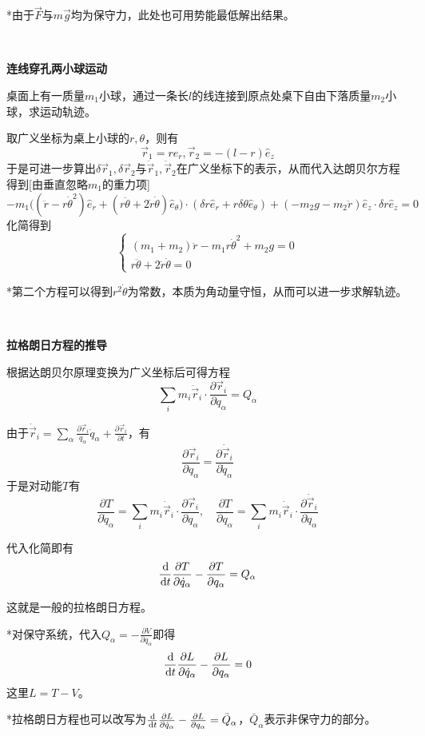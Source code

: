 \documentclass[a4paper,UTF8,fontset=windows]{ctexart}
\newcommand*{\dr}{\hspace{0.07em}\mathrm{d}}
\begin{document}
*由于$\vec{F}$与$m\vec{g}$均为保守力，此处也可用势能最低解出结果。

\

\textbf{连线穿孔两小球运动}

桌面上有一质量$m_1$小球，通过一条长$l$的线连接到原点处桌下自由下落质量$m_2$小球，求运动轨迹。

取广义坐标为桌上小球的$r,\theta$，则有
$$\vec{r}_1=r\hat{e}_r,\vec{r}_2=-(l-r)\hat{e}_z$$
于是可进一步算出$\delta\vec{r}_1,\delta\vec{r}_2$与$\ddot{\vec{r}}_1,\ddot{\vec{r}}_2$在广义坐标下的表示，从而代入达朗贝尔方程得到[由垂直忽略$m_1$的重力项]
$$-m_1\big((\ddot{r}-r\dot{\theta}^2)\hat{e}_r+(r\ddot{\theta}+2\dot{r}\dot{\theta})\hat{e}_\theta\big)\cdot(\delta r\hat{e}_r+r\delta\theta\hat{e}_\theta)+(-m_2g-m_2\ddot{r})\hat{e}_z\cdot\delta r\hat{e}_z=0$$
化简得到
$$\begin{cases}(m_1+m_2)\ddot{r}-m_1r\dot{\theta}^2+m_2g=0\\r\ddot{\theta}+2\dot{r}\dot{\theta}=0\end{cases}$$

*第二个方程可以得到$r^2\dot\theta$为常数，本质为角动量守恒，从而可以进一步求解轨迹。

\

\textbf{拉格朗日方程的推导}

根据达朗贝尔原理变换为广义坐标后可得方程
$$\sum_im_i\ddot{\vec{r}}_i\cdot\frac{\partial\vec{r}_i}{\partial q_\alpha}=Q_\alpha$$

由于$\dot{\vec{r}}_i=\sum_\alpha\frac{\partial\vec{r}_i}{q_\alpha}\dot{q}_\alpha+\frac{\partial\vec{r}_i}{\partial t}$，有
$$\frac{\partial\vec{r}_i}{\partial q_\alpha}=\frac{\partial\dot{\vec{r}}_i}{\partial\dot{q}_\alpha}$$
于是对动能$T$有
$$\frac{\partial T}{\partial\dot{q}_\alpha}=\sum_im_i\dot{\vec{r}}_i\cdot\frac{\partial\vec{r}_i}{\partial q_\alpha},\quad\frac{\partial T}{\partial q_\alpha}=\sum_im_i\dot{\vec{r}}_i\cdot\frac{\partial\dot{\vec{r}}_i}{\partial q_\alpha}$$

代入化简即有
$$\frac{\dr}{\dr t}\frac{\partial T}{\partial\dot{q}_\alpha}-\frac{\partial T}{\partial q_\alpha}=Q_\alpha$$

这就是一般的拉格朗日方程。

*对保守系统，代入$Q_\alpha=-\frac{\partial V}{\partial q_\alpha}$即得
$$\frac{\dr}{\dr t}\frac{\partial L}{\partial\dot{q}_\alpha}-\frac{\partial L}{\partial q_\alpha}=0$$
这里$L=T-V$。

*拉格朗日方程也可以改写为$\frac{\dr}{\dr t}\frac{\partial L}{\partial\dot{q}_\alpha}-\frac{\partial L}{\partial q_\alpha}=\bar{Q}_\alpha$，$\bar{Q}_\alpha$表示非保守力的部分。
\end{document}
